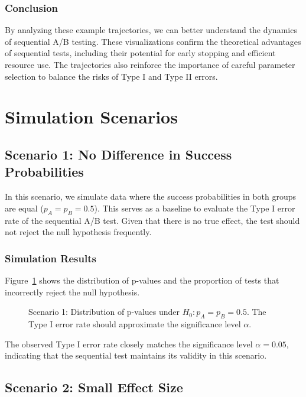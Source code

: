 \documentclass[magisterska, english]{pwr_wmat_praca_dyplomowa}
\theoremstyle{plain}
\numberwithin{theorem}{chapter}
\theoremstyle{definition}
\numberwithin{theorem}{chapter}
\begin{document}
\subsubsection{Conclusion}

By analyzing these example trajectories, we can better understand the dynamics of sequential A/B testing. These visualizations confirm the theoretical advantages of sequential tests, including their potential for early stopping and efficient resource use. The trajectories also reinforce the importance of careful parameter selection to balance the risks of Type I and Type II errors.


\section{Simulation Scenarios}

\subsection{Scenario 1: No Difference in Success Probabilities}

In this scenario, we simulate data where the success probabilities in both groups are equal (\( p_A = p_B = 0.5 \)). This serves as a baseline to evaluate the Type I error rate of the sequential A/B test. Given that there is no true effect, the test should not reject the null hypothesis frequently.

\subsubsection{Simulation Results}

Figure~\ref{fig:scenario1} shows the distribution of p-values and the proportion of tests that incorrectly reject the null hypothesis.

\begin{figure}[H]
	\centering
	\caption{Scenario 1: Distribution of p-values under \( H_0: p_A = p_B = 0.5 \). The Type I error rate should approximate the significance level \( \alpha \).}
	\label{fig:scenario1}
\end{figure}

The observed Type I error rate closely matches the significance level \( \alpha = 0.05 \), indicating that the sequential test maintains its validity in this scenario.

\subsection{Scenario 2: Small Effect Size}
\end{document}
